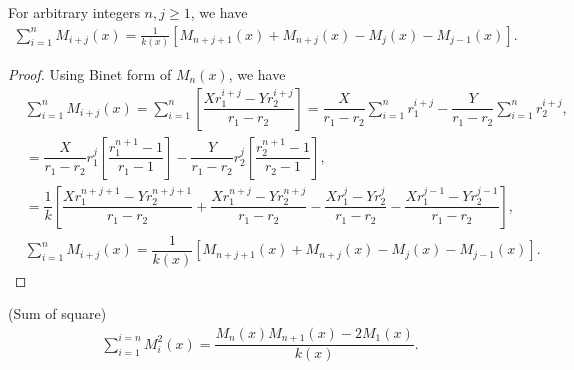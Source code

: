\begin{theorem}
For arbitrary integers $n,j\geq1$, we have
\begin{align*}
\displaystyle\sum_{i=1}^{n}M_{i+j}(x)=\frac{1}{k(x)}[{M_{n+j+1}(x)+M_{n+j}(x)-M_{j}(x)-M_{j-1}(x)}].
\end{align*}
\end{theorem}
\begin{proof}
Using Binet form of $M_{n}(x)$, we have
\begin{align*}
&\displaystyle\sum_{i=1}^{n}M_{i+j}(x)= \sum_{i=1}^{n}[\dfrac{{Xr_{1}^{i+j}}-Yr_{2}^{i+j}}{r_{1}-r_{2}}]= \dfrac{X}{r_{1}-r_{2}}\sum_{i=1}^{n}r_{1}^{i+j}-\dfrac{Y}{r_{1}-r_{2}}\sum_{i=1}^{n}r_{2}^{i+j},\\
&= \dfrac{X}{r_{1}-r_{2}}r_{1}^j[\dfrac{r_{1}^{n+1}-1}{r_{1}-1}]-\dfrac{Y}{r_{1}-r_{2}}r_{2}^j[\dfrac{r_{2}^{n+1}-1}{r_{2}-1}],\\
&=\dfrac{1}{k}[\dfrac{Xr_{1}^{n+j+1}-Yr_{2}^{n+j+1}}{r_{1}-r_{2}}+\dfrac{Xr_{1}^{n+j}-Yr_{2}^{n+j}}{r_{1}-r_{2}}-\dfrac{Xr_{1}^{j}-Yr_{2}^{j}}{r_{1}-r_{2}}-\dfrac{Xr_{1}^{j-1}-Yr_{2}^{j-1}}{r_{1}-r_{2}}],\\
&\sum_{i=1}^{n}M_{i+j}(x)=\dfrac{1}{k(x)}[{M_{n+j+1}(x)+M_{n+j}(x)-M_{j}(x)-M_{j-1}(x)}].
\end{align*}
\end{proof}
\begin{theorem}(Sum of square)
\begin{align*}
\displaystyle\sum_{i=1}^{i=n}M_{i}^2(x)=\dfrac{M_{n}(x)M_{n+1}(x)-2M_{1}(x)}{k(x)}.
\end{align*}
\end{theorem}
